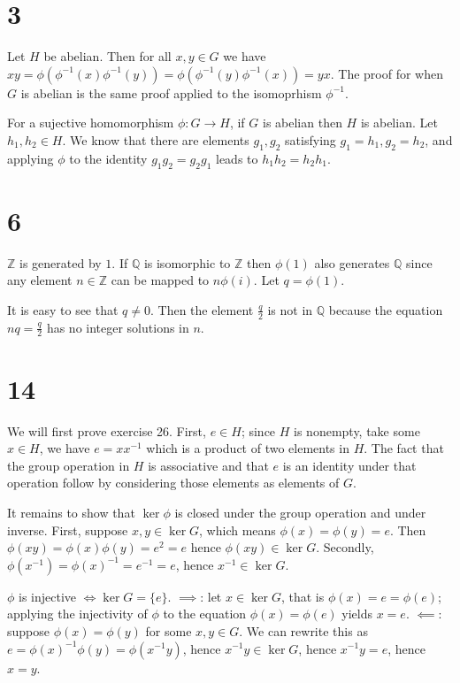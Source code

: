 \documentclass{article}
\def\Z{\mathbb{Z}}
\def\Q{\mathbb{Q}}
\def\inv{{-1}}
\begin{document}
\section*{3}

Let $H$ be abelian. Then for all $x, y \in G$ we have $xy = \phi(\phi^\inv(x) \phi^\inv(y)) = \phi(\phi^\inv(y) \phi^\inv(x)) = yx$. The proof for when $G$ is abelian is the same proof applied to the isomoprhism $\phi^\inv$.

For a sujective homomorphism $\phi: G \to H$, if $G$ is abelian then $H$ is abelian. Let $h_1, h_2 \in H$. We know that there are elements $g_1, g_2$ satisfying $g_1 = h_1, g_2 = h_2$, and applying $\phi$ to the identity $g_1 g_2 = g_2 g_1$ leads to $h_1 h_2 = h_2 h_1$.

\section*{6}

$\Z$ is generated by $1$. If $\Q$ is isomorphic to $\Z$ then $\phi(1)$ also generates $\Q$ since any element $n \in \Z$ can be mapped to $n\phi(i)$. Let $q = \phi(1)$.

It is easy to see that $q \ne 0$. Then the element $\frac{q}{2}$ is not in $\Q$ because the equation $nq = \frac{q}{2}$ has no integer solutions in $n$.

\section*{14}

We will first prove exercise 26. First, $e \in H$; since $H$ is nonempty, take some $x \in H$, we have $e = x x^\inv$ which is a product of two elements in $H$. The fact that the group operation in $H$ is associative and that $e$ is an identity under that operation follow by considering those elements as elements of $G$.

It remains to show that $\ker \phi$ is closed under the group operation and under inverse. First, suppose $x, y \in \ker G$, which means $\phi(x) = \phi(y) = e$. Then $\phi(xy) = \phi(x) \phi(y) = e^2 = e$ hence $\phi(xy) \in \ker G$. Secondly, $\phi(x^\inv) = \phi(x)^\inv = e^\inv = e$, hence $x^\inv \in \ker G$.

$\phi$ is injective $\iff \ker G = \{e\}$. $\implies$: let $x \in \ker G$, that is $\phi(x) = e = \phi(e)$; applying the injectivity of $\phi$ to the equation $\phi(x) = \phi(e)$ yields $x = e$. $\impliedby$: suppose $\phi(x) = \phi(y)$ for some $x, y \in G$. We can rewrite this as $e = \phi(x)^\inv\phi(y) = \phi(x^\inv y)$, hence $x^\inv y \in \ker G$, hence $x^\inv y = e$, hence $x = y$.
\end{document}
